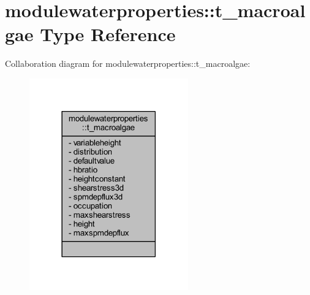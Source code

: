\hypertarget{structmodulewaterproperties_1_1t__macroalgae}{}\section{modulewaterproperties\+:\+:t\+\_\+macroalgae Type Reference}
\label{structmodulewaterproperties_1_1t__macroalgae}


Collaboration diagram for modulewaterproperties\+:\+:t\+\_\+macroalgae\+:\nopagebreak
\begin{figure}[H]
\begin{center}
\leavevmode
\includegraphics[width=194pt]{structmodulewaterproperties_1_1t__macroalgae__coll__graph}
\end{center}
\end{figure}
